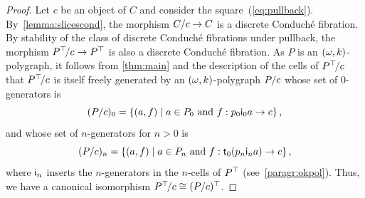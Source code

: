   \begin{proof}
   Let $c$ be an object of $C$ and consider the
   square~(\ref{eq:pullback}). By~\cref{lemma:slicescond}, the
   morphism $C/c\to C$ is a discrete Conduché fibration. By stability of the class of discrete Conduché fibrations under pullback, the morphism $P^\top\!/c\to P^\top$ is also a discrete Conduché fibration. As $P$ is an $(\omega,k)$-polygraph, it follows from \cref{thm:main} and the description
   of the cells of $P^\top\!/c$
   that $P^\top\!/c$ is itself freely generated by an $(\omega,k)$\nbd-polygraph $P/c$ whose set of $0$-generators is
   \[
     (\tr Pc)_0=\setof{\pair{a}{f}}{a\in P_0\ \hbox{and}\  f:p_0\gni 0 a\to c},
   \]
   and whose set of $n$-generators for $n>0$ is
   \[
     (\tr Pc)_n=\setof{\pair{a}{f}}{a\in P_n\ \hbox{and}\  f:\tge 0(p_n\gni n a)\to c},
   \]
   where $\mathsf{i}_{n}$ inserts the $n$-generators in the $n$-cells of
   $P^\top$ (see~\ref{paragr:okpol}). Thus, we have a canonical isomorphism
   $P^\top\!/c\cong (P/c)^\top$.


\end{proof}
